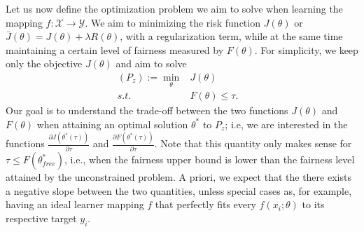 \documentclass{article}
\newcommand{\Y}{\mathcal{Y}}
\newcommand{\X}{\mathcal{X}}
\begin{document}
Let us now define the optimization problem we aim to solve when learning the mapping $f:\X\rightarrow\Y$. We aim to minimizing the risk function $J(\theta)$ or $\bar{J}(\theta)=J(\theta) + \lambda R(\theta)$, with a regularization term, while at the same time maintaining a certain level of fairness measured by $F(\theta)$. For simplicity, we keep only the objective $J(\theta)$ and aim to solve
\begin{equation}
\begin{array}{rc}
   (P_z):= \min_{\theta} &   J(\theta) \quad \quad \quad\\
     s.t. & F(\theta) \leq \tau.
\end{array}
\end{equation}
Our goal is to understand the trade-off between the two functions $J(\theta)$ and $F(\theta)$ when attaining an optimal solution $\theta^*$ to $P_z$; i.e, we are interested in the functions $\frac{\partial J(\theta^*(\tau))}{\partial\tau}$ and $\frac{\partial F(\theta^*(\tau))}{\partial\tau}$. Note that this quantity only makes sense for $\tau \leq F(\theta^*_{free})$, i.e., when the fairness upper bound is lower than the fairness level attained by the unconstrained problem. A priori, we expect that the there exists a negative slope between the two quantities, unless special cases as, for example, having an ideal learner mapping $f$ that perfectly fits every $f(x_i;\theta)$ to its respective target $y_i$.
\end{document}
